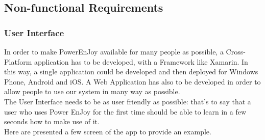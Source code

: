 \subsection{Non-functional Requirements}

\subsubsection{User Interface}
\begin{flushleft}
In order to make PowerEnJoy available for many people as possible,
a Cross-Platform application has to be developed, with a Framework
like Xamarin. In this way, a single application could be developed
and then deployed for Windows Phone, Android and iOS. A Web Application
has also to be developed in order to allow people to use our system
in many way as possible.\\
The User Interface needs to be as user friendly as possible: that's
to say that a user who uses Power EnJoy for the first time should
be able to learn in a few seconds how to make use of it. \\
Here are presented a few screen of the app to provide an example.
\par\end{flushleft}

